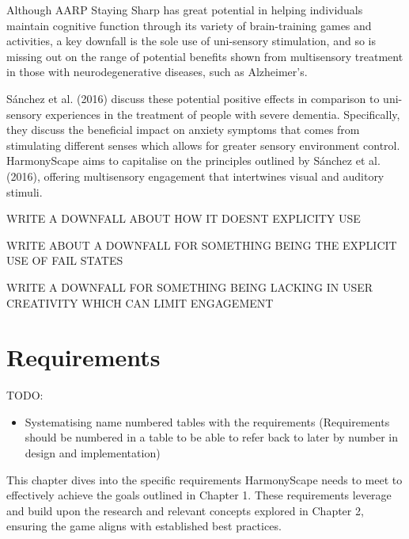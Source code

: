 \documentclass{l4proj}
\begin{document}
Although AARP Staying Sharp has great potential in helping individuals maintain cognitive function through its variety of brain-training games and activities, a key downfall is the sole use of uni-sensory stimulation, and so is missing out on the range of potential benefits shown from multisensory treatment in those with neurodegenerative diseases, such as Alzheimer's.

Sánchez et al. (2016) discuss these potential positive effects in comparison to uni-sensory experiences in the treatment of people with severe dementia. Specifically, they discuss the beneficial impact on anxiety symptoms that comes from stimulating different senses which allows for greater sensory environment control. HarmonyScape aims to capitalise on the principles outlined by Sánchez et al. (2016), offering multisensory engagement that intertwines visual and auditory stimuli.


WRITE A DOWNFALL ABOUT HOW IT DOESNT EXPLICITY USE 

WRITE ABOUT A DOWNFALL FOR SOMETHING BEING THE EXPLICIT USE OF FAIL STATES

WRITE A DOWNFALL FOR SOMETHING BEING LACKING IN USER CREATIVITY WHICH CAN LIMIT ENGAGEMENT


\chapter{Requirements}

TODO:
\begin{itemize}
    \item Systematising name numbered tables with the requirements (Requirements should be numbered in a table to be able to refer back to later by number in design and implementation)
\end{itemize}

This chapter dives into the specific requirements HarmonyScape needs to meet to effectively achieve the goals outlined in Chapter 1. These requirements leverage and build upon the research and relevant concepts explored in Chapter 2, ensuring the game aligns with established best practices.

\end{document}
